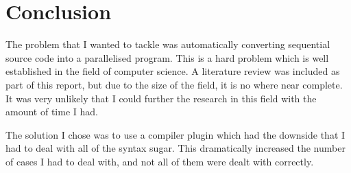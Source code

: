 \chapter{Conclusion}
The problem that I wanted to tackle was automatically converting sequential source code into a parallelised program. This is a hard problem which is well established in the field of computer science. A literature review was included as part of this report, but due to the size of the field, it is no where near complete. It was very unlikely that I could further the research in this field with the amount of time I had.

The solution I chose was to use a compiler plugin which had the downside that I had to deal with all of the syntax sugar. This dramatically increased the number of cases I had to deal with, and not all of them were dealt with correctly. 

